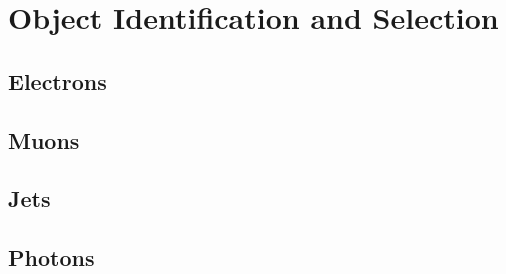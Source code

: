 
\chapter{Object Identification and Selection} %

\label{ch:objects} 


\section{Electrons}
\section{Muons}
\section{Jets}
\section{Photons}
